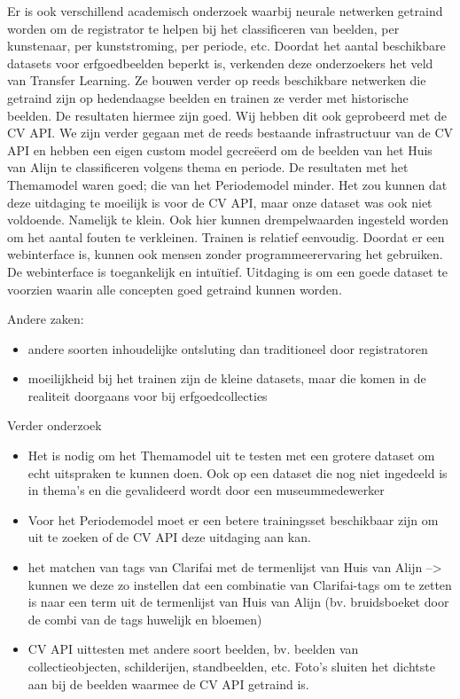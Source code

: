 Er is ook verschillend academisch onderzoek waarbij neurale netwerken getraind worden om de registrator te helpen bij het classificeren van beelden, per kunstenaar, per kunststroming, per periode, etc. Doordat het aantal beschikbare datasets voor erfgoedbeelden beperkt is, verkenden deze onderzoekers het veld van Transfer Learning. Ze bouwen verder op reeds beschikbare netwerken die getraind zijn op hedendaagse beelden en trainen ze verder met historische beelden. De resultaten hiermee zijn goed.
Wij hebben dit ook geprobeerd met de CV API. We zijn verder gegaan met de reeds bestaande infrastructuur van de CV API en hebben een eigen custom model gecreëerd om de beelden van het Huis van Alijn te classificeren volgens thema en periode. De resultaten met het Themamodel waren goed; die van het Periodemodel minder. Het zou kunnen dat deze uitdaging te moeilijk is voor de CV API, maar onze dataset was ook niet voldoende. Namelijk te klein. Ook hier kunnen drempelwaarden ingesteld worden om het aantal fouten te verkleinen.
Trainen is relatief eenvoudig. Doordat er een webinterface is, kunnen ook mensen zonder programmeerervaring het gebruiken. De webinterface is toegankelijk en intuïtief. Uitdaging is om een goede dataset te voorzien waarin alle concepten goed getraind kunnen worden.

Andere zaken:
\begin{itemize}
	\item andere soorten inhoudelijke ontsluting dan traditioneel door registratoren
	\item moeilijkheid bij het trainen zijn de kleine datasets, maar die komen in de realiteit doorgaans voor bij erfgoedcollecties
\end{itemize}

Verder onderzoek
\begin{itemize}
	\item Het is nodig om het Themamodel uit te testen met een grotere dataset om echt uitspraken te kunnen doen. Ook op een dataset die nog niet ingedeeld is in thema's en die gevalideerd wordt door een museummedewerker
	\item Voor het Periodemodel moet er een betere trainingsset beschikbaar zijn om uit te zoeken of de CV API deze uitdaging aan kan.
	\item het matchen van tags van Clarifai met de termenlijst van Huis van Alijn --> kunnen we deze zo instellen dat een combinatie van Clarifai-tags om te zetten is naar een term uit de termenlijst van Huis van Alijn (bv. bruidsboeket door de combi van de tags huwelijk en bloemen)
	\item CV API uittesten met andere soort beelden, bv. beelden van collectieobjecten, schilderijen, standbeelden, etc. Foto's sluiten het dichtste aan bij de beelden waarmee de CV API getraind is.
\end{itemize}


